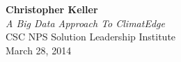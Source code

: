 \begin{titlepage}
    \vspace*{\fill}
    \begin{center}
        \textbf{\Large Christopher Keller}\\[1cm]
        \textit{A Big Data Approach To ClimatEdge\texttrademark{}}\\ [.5cm]
        CSC NPS Solution Leadership Institute\\ [.5cm]
        March 28, 2014
    \end{center}
    \vspace*{\fill}
\end{titlepage}
